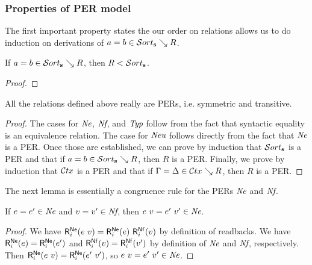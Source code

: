 \subsubsection{Properties of PER model}

The first important property states the our order on relations allows us to do induction on derivations of $a = b \in \persort \searrow R$.

\begin{lemma}
  If $a = b \in \persort \searrow R$, then $R < \persort$.
\end{lemma}
\begin{proof}
\end{proof}

\begin{lemma}
  All the relations defined above really are \acp{PER}, i.e. symmetric and transitive.
\end{lemma}
\begin{proof}
  The cases for ${\normalfont\textit{Ne}}$, ${\normalfont\textit{Nf}}$, and ${\normalfont\textit{Typ}}$ follow from the fact that syntactic equality is an equivalence relation.
  The case for ${\normalfont\textit{Neu}}$ follows directly from the fact that ${\normalfont\textit{Ne}}$ is a \ac{PER}.
  Once those are established, we can prove by induction that $\persort$ is a \ac{PER} and that if $a = b \in \persort \searrow R$, then $R$ is a \ac{PER}.
  Finally, we prove by induction that $\mathcal{C}tx$ is a \ac{PER} and that if $\Gamma = \Delta \in \mathcal{C}tx \searrow R$, then $R$ is a \ac{PER}.
\end{proof}

The next lemma is essentially a congruence rule for the PERs ${\normalfont\textit{Ne}}$ and ${\normalfont\textit{Nf}}$.

\begin{lemma}
  If $e = e' \in {\normalfont\textit{Ne}}$ and $v = v' \in {\normalfont\textit{Nf}}$, then $e~v = e'~v' \in {\normalfont\textit{Ne}}$.
\end{lemma}
\begin{proof}
  We have $\rbnefunc {\dapp e v} = \tmapp {\rbnefunc e} {\rbnffunc v}$ by definition of readbacks.
  We have $\rbnefunc e = \rbnefunc {e'}$ and $\rbnffunc v = \rbnffunc {v'}$ by definition of ${\normalfont\textit{Ne}}$ and ${\normalfont\textit{Nf}}$, respectively.
  Then $\rbnefunc {\dapp e v} = \rbnefunc {\dapp {e'} {v'}}$, so $e~v = e'~v' \in {\normalfont\textit{Ne}}$.
\end{proof}

